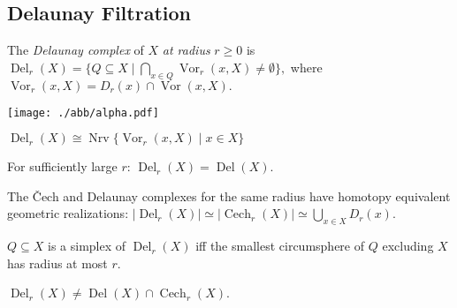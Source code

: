 \begin{multicols*}{3}
\subsection{Delaunay Filtration}
\begin{definition}
The \emph{Delaunay complex} of $X$ \emph{at radius} $r\geq 0$ is 
$
\operatorname{Del}_r(X) = \{ Q\subseteq X \mid \bigcap_{x\in Q} \operatorname{Vor}_r(x,X) \neq \emptyset \},
$
where
$\operatorname{Vor}_r(x,X)=D_r(x)\cap \operatorname{Vor}(x,X).$
\begin{center}\vspace{-0.53pc}
\texttt{[image: ./abb/alpha.pdf]} \vspace{-0.34pc}
\end{center}
\end{definition}
\rspace
\begin{rem}
$\operatorname{Del}_r(X) \cong \operatorname{Nrv} {\{\operatorname{Vor}_r(x,X)\mid x\in X\}}$
\end{rem}
\rspace
\begin{rem}
For sufficiently large $r$: $\operatorname{Del}_r(X)= \operatorname{Del}(X)$.
\end{rem}
\rspace
\begin{remark} The Čech and Delaunay complexes for the same radius have homotopy equivalent geometric realizations:
$|\operatorname{Del}_r(X)| \simeq |\operatorname{Cech}_r(X)|\simeq \bigcup_{x\in X} D_r(x).$
\end{remark}
\rspace
\begin{remark}
$Q \subseteq X$ is a simplex of $\operatorname{Del}_r (X)$ iff the smallest circumsphere of $Q$ excluding $X$ has radius at most $r$.
\end{remark}
\rspace
\begin{rem}
$\operatorname{Del}_r(X) \neq \operatorname{Del}(X)\cap \operatorname{Cech}_r(X)$.
\end{rem}
\rspace\drawaline\\\vspace{-0.5pc}

\end{multicols*}
